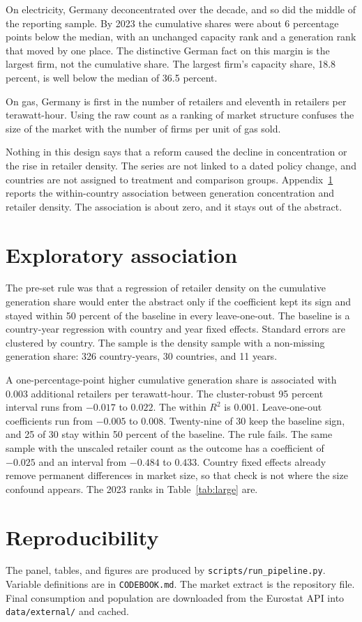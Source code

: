 \documentclass[11pt,a4paper]{article}
\begin{document}
On electricity, Germany deconcentrated over the decade, and so did the middle of the reporting sample. By 2023 the cumulative shares were about 6 percentage points below the median, with an unchanged capacity rank and a generation rank that moved by one place. The distinctive German fact on this margin is the largest firm, not the cumulative share. The largest firm's capacity share, 18.8 percent, is well below the median of 36.5 percent.

On gas, Germany is first in the number of retailers and eleventh in retailers per terawatt-hour. Using the raw count as a ranking of market structure confuses the size of the market with the number of firms per unit of gas sold.

Nothing in this design says that a reform caused the decline in concentration or the rise in retailer density. The series are not linked to a dated policy change, and countries are not assigned to treatment and comparison groups. Appendix~\ref{app:rq3} reports the within-country association between generation concentration and retailer density. The association is about zero, and it stays out of the abstract.




\appendix

\section{Exploratory association}
\label{app:rq3}

The pre-set rule was that a regression of retailer density on the cumulative generation share would enter the abstract only if the coefficient kept its sign and stayed within 50 percent of the baseline in every leave-one-out. The baseline is a country-year regression with country and year fixed effects. Standard errors are clustered by country. The sample is the density sample with a non-missing generation share: 326 country-years, 30 countries, and 11 years.

A one-percentage-point higher cumulative generation share is associated with 0.003 additional retailers per terawatt-hour. The cluster-robust 95 percent interval runs from $-0.017$ to $0.022$. The within $R^{2}$ is 0.001. Leave-one-out coefficients run from $-0.005$ to $0.008$. Twenty-nine of 30 keep the baseline sign, and 25 of 30 stay within 50 percent of the baseline. The rule fails. The same sample with the unscaled retailer count as the outcome has a coefficient of $-0.025$ and an interval from $-0.484$ to $0.433$. Country fixed effects already remove permanent differences in market size, so that check is not where the size confound appears. The 2023 ranks in Table~\ref{tab:large} are.

\section{Reproducibility}

The panel, tables, and figures are produced by \texttt{scripts/run\_pipeline.py}. Variable definitions are in \texttt{CODEBOOK.md}. The market extract is the repository file. Final consumption and population are downloaded from the Eurostat API into \texttt{data/external/} and cached.
\end{document}
